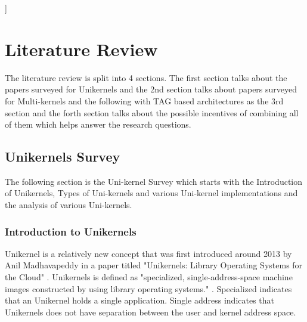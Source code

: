 ]%

\chapter{Literature Review}  %

\ifpdf
    \graphicspath{{LiteratureReview/Figs/Raster/}{LiteratureReview/Figs/PDF/}{LiteratureReview/Figs/}}
\else
    \graphicspath{{LiteratureReview/Figs/}{LiteratureReview/Figs/}}
\fi


The literature review is split into 4 sections. The first section talks about the papers surveyed 
for Unikernels and the 2nd section talks about papers surveyed for Multi-kernels and the following 
with TAG based architectures as the 3rd section and the forth section talks about the possible incentives of combining all of 
them which helps answer the research questions.

\section[Unikernels]{Unikernels Survey}
The following section is the Uni-kernel Survey which starts 
with the Introduction of Unikernels, Types of Uni-kernels and 
various Uni-kernel implementations and the analysis 
of various Uni-kernels. 

\subsection{Introduction to Unikernels}
Unikernel is a relatively new concept that was first introduced around 2013 by Anil Madhavapeddy in a 
paper titled "Unikernels: Library Operating Systems for the Cloud" \cite{FirstUnikernelPaper}. Unikernels 
is defined as "specialized, single-address-space machine images constructed by using library 
operating systems." \cite{UnikernelDefinition}. Specialized indicates that an Unikernel holds a single application.
Single address indicates that Unikernels does not have separation between the user and kernel address 
space. 

